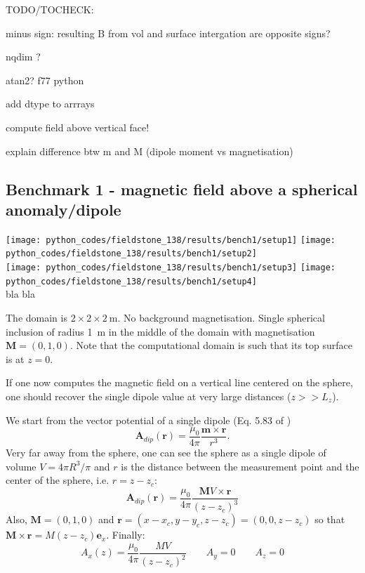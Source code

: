 TODO/TOCHECK:

minus sign: resulting B from vol and surface intergation are opposite signs?

nqdim ? 

atan2? f77 python 

add dtype to arrrays

compute field above vertical face!

explain difference btw m and M (dipole moment vs magnetisation)

\newpage
\subsection*{Benchmark 1 - magnetic field above a spherical anomaly/dipole}

\begin{center}
\texttt{[image: python\_codes/fieldstone\_138/results/bench1/setup1]}
\texttt{[image: python\_codes/fieldstone\_138/results/bench1/setup2]}\\
\texttt{[image: python\_codes/fieldstone\_138/results/bench1/setup3]}
\texttt{[image: python\_codes/fieldstone\_138/results/bench1/setup4]}\\
{\captionfont bla bla}
\end{center}

The domain is $2\times 2\times 2~\si{\meter}$. No background magnetisation. Single spherical inclusion 
of radius \SI{1}{\meter} in the middle of the domain with magnetisation ${\bm M}=(0,1,0)$. 
Note that the computational domain is such that its top surface is at $z=0$.

If one now computes the magnetic field on a vertical line centered on the sphere, one 
should recover the single dipole value at very large distances ($z>>L_z$). 

We start from the vector potential of a single dipole (Eq. 5.83 of \cite{griffiths}) 
\[
{\bm A}_{dip}({\bm r}) = \frac{\mu_0}{4\pi} \frac{{\bm m}\times {\bm r}}{r^3}.
\]
Very far away from the sphere, one can see the sphere as a single dipole of volume $V=4\pi R^3/\pi$
and $r$ is the distance between the measurement point and the center of the sphere, i.e. $r=z-z_c$:
\[
{\bm A}_{dip}({\bm r}) = \frac{\mu_0}{4\pi} \frac{{\bm M} V\times {\bm r}}{(z-z_c)^3}
\]
Also, ${\bm M}=(0,1,0)$ and ${\bm r}=(x-x_c,y-y_c,z-z_c)=(0,0,z-z_c)$ so that ${\bm M}\times {\bm r}=M (z-z_c) {\bm e}_x$.
Finally:
\[
A_x(z)=\frac{\mu_0}{4\pi} \frac{MV}{(z-z_c)^2}  \quad\quad
A_y=0 \quad\quad
A_z=0
\]



